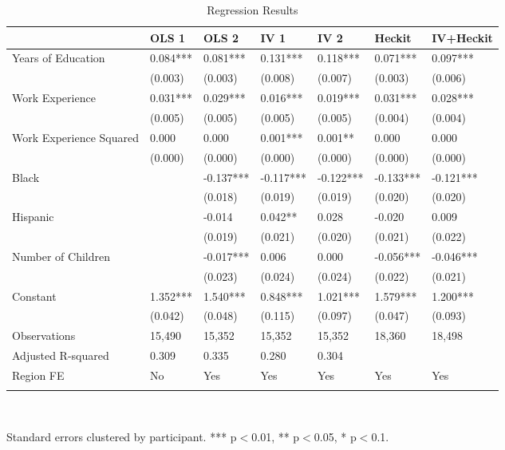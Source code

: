 \begin{table}[h] \centering
{}

\caption{Regression Results}
{\footnotesize
\begin{tabularx}{\linewidth}{@{}lCCCCCC@{}}

\toprule
&OLS 1&OLS 2&IV 1&IV 2&Heckit&IV+Heckit \tabularnewline
\midrule Years of Education&0.084***&0.081***&0.131***&0.118***&0.071***&0.097*** \tabularnewline
&(0.003)&(0.003)&(0.008)&(0.007)&(0.003)&(0.006) \tabularnewline
Work Experience&0.031***&0.029***&0.016***&0.019***&0.031***&0.028*** \tabularnewline
&(0.005)&(0.005)&(0.005)&(0.005)&(0.004)&(0.004) \tabularnewline
Work Experience Squared&0.000&0.000&0.001***&0.001**&0.000&0.000 \tabularnewline
&(0.000)&(0.000)&(0.000)&(0.000)&(0.000)&(0.000) \tabularnewline
Black&&-0.137***&-0.117***&-0.122***&-0.133***&-0.121*** \tabularnewline
&&(0.018)&(0.019)&(0.019)&(0.020)&(0.020) \tabularnewline
Hispanic&&-0.014&0.042**&0.028&-0.020&0.009 \tabularnewline
&&(0.019)&(0.021)&(0.020)&(0.021)&(0.022) \tabularnewline
Number of Children&&-0.017***&0.006&0.000&-0.056***&-0.046*** \tabularnewline
&&(0.023)&(0.024)&(0.024)&(0.022)&(0.021) \tabularnewline
Constant&1.352***&1.540***&0.848***&1.021***&1.579***&1.200*** \tabularnewline
&(0.042)&(0.048)&(0.115)&(0.097)&(0.047)&(0.093) \tabularnewline
\midrule Observations&15,490&15,352&15,352&15,352&18,360&18,498 \tabularnewline
Adjusted R-squared&0.309&0.335&0.280&0.304&& \tabularnewline
Region FE&No&Yes&Yes&Yes&Yes&Yes \tabularnewline
\bottomrule \addlinespace[\belowrulesep]

\end{tabularx}
\\ \parbox{\linewidth}{\footnotesize Standard errors clustered by participant. *** p$<$0.01, ** p$<$0.05, * p$<$0.1.}
}
\end{table}
